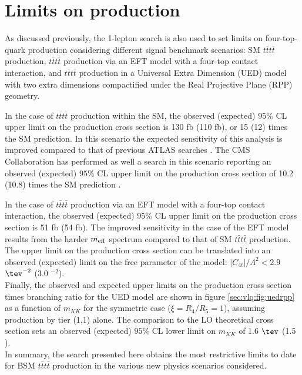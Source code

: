 \section[Limits on $t\bar{t}t\bar{t}$ production]{Limits on  production}

As discussed previously, the 1-lepton search is also used to set limits on four-top-quark production considering different signal benchmark scenarios: SM $t\bar{t}t\bar{t}$ production, $t\bar{t}t\bar{t}$ production via an EFT model with a four-top contact interaction, and $t\bar{t}t\bar{t}$ production in a Universal Extra Dimension (UED) model with two extra dimensions compactified under the Real Projective Plane (RPP) geometry.\par
In the case of $t\bar{t}t\bar{t}$ production within the SM, the observed (expected) $95\%$ CL upper limit on the production cross section is 130 fb (110 fb), or 15 (12) times the SM prediction.
In this scenario the expected sensitivity of this analysis is improved compared to that of previous ATLAS searches \cite{ATLAS-CONF-2016-013,ATLAS-CONF-2016-020}. The CMS Collaboration has performed as well a search in this scenario reporting an observed (expected) $95\%$ CL upper limit on the production cross section of 10.2 (10.8) times the SM prediction \cite{CMS-PAS-TOP-16-016}.\par
In the case of $t\bar{t}t\bar{t}$  production via an EFT model with a four-top contact interaction, the observed (expected) $95\%$ CL upper limit on the production cross section is 51 fb (54 fb). The improved sensitivity in the case of the EFT model results from the harder $m_{\rm eff}$ spectrum compared to that of SM $t\bar{t}t\bar{t}$ production. The upper limit on the production cross section can be translated into an observed (expected) limit on the free parameter of the model: $|C_{4t}|/\Lambda^{2} < 2.9$ $\tev^{-2}$ ($3.0$ \tev$^{-2}$).\\ \indent
Finally, the observed and expected upper limits on the production cross section times branching ratio for the UED model are shown in figure \ref{sec:vlq:fig:uedrpp} as a function of $m_{KK}$ for the symmetric case ($\xi = R_{4}/R_{5} = 1$), assuming production by tier (1,1) alone. The comparison to the LO theoretical cross section sets an observed (expected) $95\%$ CL lower limit on $m_{KK}$ of 1.6 $\tev$ (1.5 \tev). \\ \indent
In summary, the search presented here obtains the most restrictive limits to date for BSM $t\bar{t}t\bar{t}$ production in the various new physics scenarios considered.


